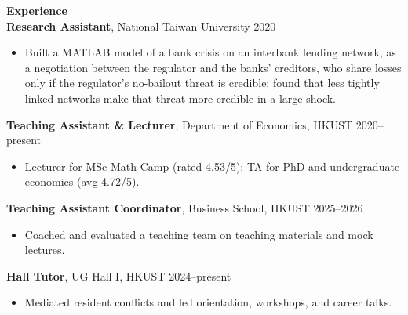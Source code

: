 \documentclass[11pt,letterpaper]{article}
\begin{document}
{\large \textbf{Experience}}\\[-0.5pt]
\textbf{Research Assistant}, National Taiwan University \hfill 2020\\
\vspace{-6pt}
\begin{itemize}
  \item Built a MATLAB model of a bank crisis on an interbank lending network, as a negotiation between the regulator and the banks' creditors, who share losses only if the regulator's no-bailout threat is credible; found that less tightly linked networks make that threat more credible in a large shock.
\end{itemize}
\textbf{Teaching Assistant \& Lecturer}, Department of Economics, HKUST \hfill 2020--present\\
\vspace{-6pt}
\begin{itemize}
  \item Lecturer for MSc Math Camp (rated 4.53/5); TA for PhD and undergraduate economics (avg 4.72/5).
\end{itemize}
\textbf{Teaching Assistant Coordinator}, Business School, HKUST \hfill 2025--2026\\
\vspace{-6pt}
\begin{itemize}
  \item Coached and evaluated a teaching team on teaching materials and mock lectures.
\end{itemize}
\textbf{Hall Tutor}, UG Hall I, HKUST \hfill 2024--present\\
\vspace{-6pt}
\begin{itemize}
  \item Mediated resident conflicts and led orientation, workshops, and career talks.
\end{itemize}

\vspace{0.15pt}
\end{document}
